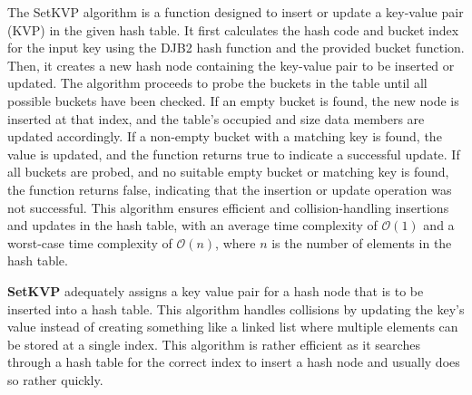 \documentclass[a4paper,9pt]{article}
\begin{document}
\begin{highlight}
The SetKVP algorithm is a function designed to insert or update a key-value pair (KVP) in the given hash table. It first calculates the hash code and bucket index for the input key using the DJB2 hash function 
and the provided bucket function. Then, it creates a new hash node containing the key-value pair to be inserted or updated. The algorithm proceeds to probe the buckets in the table until all possible buckets 
have been checked. If an empty bucket is found, the new node is inserted at that index, and the table's occupied and size data members are updated accordingly. If a non-empty bucket with a matching key is found, 
the value is updated, and the function returns true to indicate a successful update. If all buckets are probed, and no suitable empty bucket or matching key is found, the function returns false, indicating that 
the insertion or update operation was not successful. This algorithm ensures efficient and collision-handling insertions and updates in the hash table, with an average time complexity of $\mathcal{O}(1)$ and a 
worst-case time complexity of $\mathcal{O}(n)$, where $n$ is the number of elements in the hash table.

\end{highlight}

\noindent \textbf{SetKVP} adequately assigns a key value pair for a hash node that is to be inserted into a hash table. This algorithm handles collisions by updating the key's value instead of creating something
like a linked list where multiple elements can be stored at a single index. This algorithm is rather efficient as it searches through a hash table for the correct index to insert a hash node and usually does so
rather quickly.
\end{document}
